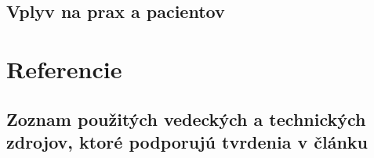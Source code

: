 \documentclass[10pt,twoside,,a4paper]{article}
\begin{document}
\subsection{Vplyv na prax a pacientov}
\section{Referencie}
\subsection{Zoznam použitých vedeckých a technických zdrojov, ktoré podporujú tvrdenia v článku}











\end{document}
